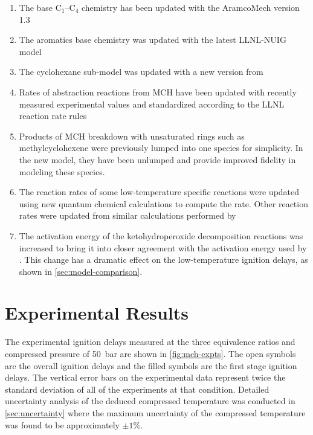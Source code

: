 \documentclass[../main.tex]{subfiles}
\begin{document}
\begin{enumerate}
    \item The base C$_1$--C$_4$ chemistry has been updated with the AramcoMech
        version 1.3 \cite{Metcalfe2013}
    \item The aromatics base chemistry was updated with the latest LLNL-NUIG
        model \cite{Nakamura2014}
    \item The cyclohexane sub-model was updated with a new version from
        \textcite{Silke2007}
    \item Rates of abstraction reactions from MCH have been updated
        with recently measured experimental values \cite{Sivaramakrishnan2009}
        and standardized according to the LLNL reaction rate rules \cite{Sarathy2011b}
    \item Products of MCH breakdown with unsaturated rings such as
        methylcyclohexene were previously lumped into one species for
        simplicity. In the new model, they have been unlumped and
        provide improved fidelity in modeling these species. \cite{Pitz2013}
    \item The reaction rates of some low-temperature specific reactions were
        updated using new quantum chemical calculations to compute the rate.
        Other reaction rates were updated from similar calculations performed
        by \textcite{Fernandes2009}
    \item The activation energy of the ketohydroperoxide decomposition
        reactions was increased to bring it into closer agreement with
        the activation energy used by \textcite{Metcalfe2013}. This change
        has a dramatic effect on the low-temperature ignition delays, as shown
        in \cref{sec:model-comparison}.
\end{enumerate}

\section{Experimental Results}
\label{sec:mch-expts}

The experimental ignition delays measured at the three equivalence ratios and
compressed pressure of \SI{50}{\bar} are shown in \cref{fig:mch-expts}. The open symbols are the
overall ignition delays and the filled symbols are the first stage ignition
delays. The vertical error bars on the experimental data represent twice the
standard deviation of all of the experiments at that condition. Detailed
uncertainty analysis of the deduced compressed temperature was conducted
in \cref{sec:uncertainty} where the maximum uncertainty of the compressed
temperature was found to be approximately $\pm 1\%$.
\end{document}
